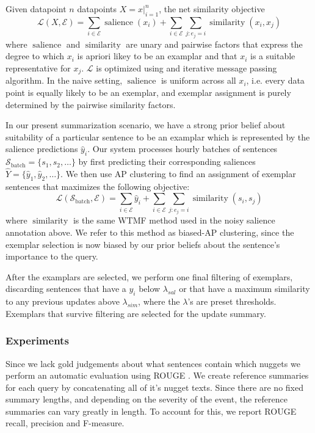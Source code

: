     Given datapoint $n$ datapoints $X =x|^n_{i=1}$, 
    the net similarity objective
    \[ \mathcal{L}(X, \mathcal{E}) = 
    \sum_{i \in \mathcal{E}} \operatorname{salience}(x_i) + \sum_{i \in\mathcal{E}} \sum_{j:e_j = i}\operatorname{similarity}(x_i, x_j)  \]
    where $\operatorname{salience}$ and $\operatorname{similarity}$ 
    are unary and pairwise factors that express the degree to which
    $x_i$ is apriori likey to be an examplar and that $x_i$ is a suitable
    representative for $x_j$. 
    $\mathcal{L}$ is optimized using and iterative message passing 
    algorithm. In the naive setting, $\operatorname{salience}$ is uniform
    across all $x_i$, i.e. every data point is equally likely to be an
    exemplar, and exemplar assignment is purely determined by the 
    pairwise similarity factors.
    
    In our present summarization scenario, we have a strong prior belief
    about suitability of a particular sentence to be an examplar which is
    represented by the salience predictions $\hat{y}_i$.
 Our system processes hourly batches of sentences 
 $\mathcal{S}_{\textrm{batch}} = \{s_1, s_2, \ldots \}$ by first predicting
 their corresponding saliences $\hat{Y} = \{\hat{y}_1, \hat{y}_2, \ldots\}$.
 We then use AP clustering to find an assignment of exemplar sentences
 that maximizes the following objective:
 \[ \mathcal{L}(\mathcal{S}_{\textrm{batch}}, \mathcal{E}) = 
    \sum_{i \in \mathcal{E}} \hat{y}_i + \sum_{i \in\mathcal{E}} \sum_{j:e_j = i}\operatorname{similarity}(s_i, s_j)  \]
    where $\operatorname{similarity}$ is the same WTMF method used in the 
    noisy salience annotation above. We refer to this method as biased-AP
    clustering, since the exemplar selection is now biased by our prior
    beliefs about the sentence's importance to the query.


    After the examplars are selected, we perform one final filtering of
    exemplars, discarding sentences that have a $y_i$ below $\lambda_{sal}$
    or that have a maximum similarity to any previous updates above
    $\lambda_{sim}$, where the $\lambda$'s are preset thresholds. 
    Exemplars that survive filtering are selected for the update summary.



    \subsubsection{Experiments}

    Since we lack gold judgements about what sentences contain which nuggets
    we perform an automatic evaluation using ROUGE \cite{lin}. We 
    create reference summaries for each query by concatenating all 
    of it's nugget texts.
    Since there are no fixed summary lengths, and depending on the severity
    of the event, the reference summaries can vary greatly in length.
    To account for this, we report ROUGE recall, precision and F-measure.


